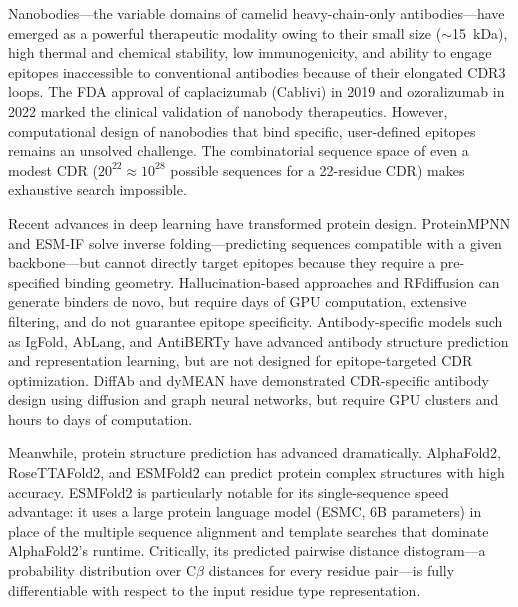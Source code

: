 \documentclass[11pt,a4paper]{article}
\begin{document}
Nanobodies---the variable domains of camelid heavy-chain-only antibodies---have emerged as a powerful therapeutic modality owing to their small size ($\sim$\SI{15}{kDa}), high thermal and chemical stability, low immunogenicity, and ability to engage epitopes inaccessible to conventional antibodies because of their elongated CDR3 loops\cite{muyldermans2013,hamers1993,jovcevska2020}. The FDA approval of caplacizumab (Cablivi) in 2019\cite{scully2019} and ozoralizumab in 2022 marked the clinical validation of nanobody therapeutics. However, computational design of nanobodies that bind specific, user-defined epitopes remains an unsolved challenge. The combinatorial sequence space of even a modest CDR ($20^{22} \approx 10^{28}$ possible sequences for a 22-residue CDR) makes exhaustive search impossible\cite{norman2020,liu2024}.

Recent advances in deep learning have transformed protein design. ProteinMPNN\cite{dauparas2022} and ESM-IF\cite{hsu2022} solve inverse folding---predicting sequences compatible with a given backbone---but cannot directly target epitopes because they require a pre-specified binding geometry. Hallucination-based approaches\cite{anishchenko2021} and RFdiffusion\cite{watson2023} can generate binders de novo, but require days of GPU computation, extensive filtering, and do not guarantee epitope specificity. Antibody-specific models such as IgFold\cite{ruffolo2023}, AbLang\cite{olsen2022}, and AntiBERTy\cite{ruffolo2021} have advanced antibody structure prediction and representation learning, but are not designed for epitope-targeted CDR optimization. DiffAb\cite{luo2022} and dyMEAN\cite{kong2023} have demonstrated CDR-specific antibody design using diffusion and graph neural networks, but require GPU clusters and hours to days of computation.

Meanwhile, protein structure prediction has advanced dramatically. AlphaFold2\cite{jumper2021}, RoseTTAFold2\cite{baek2021}, and ESMFold2\cite{lin2023} can predict protein complex structures with high accuracy. ESMFold2 is particularly notable for its single-sequence speed advantage: it uses a large protein language model (ESMC, 6B parameters)\cite{lin2023,he2022} in place of the multiple sequence alignment and template searches that dominate AlphaFold2's runtime. Critically, its predicted pairwise distance distogram---a probability distribution over C$\beta$ distances for every residue pair---is fully differentiable with respect to the input residue type representation.
\end{document}

